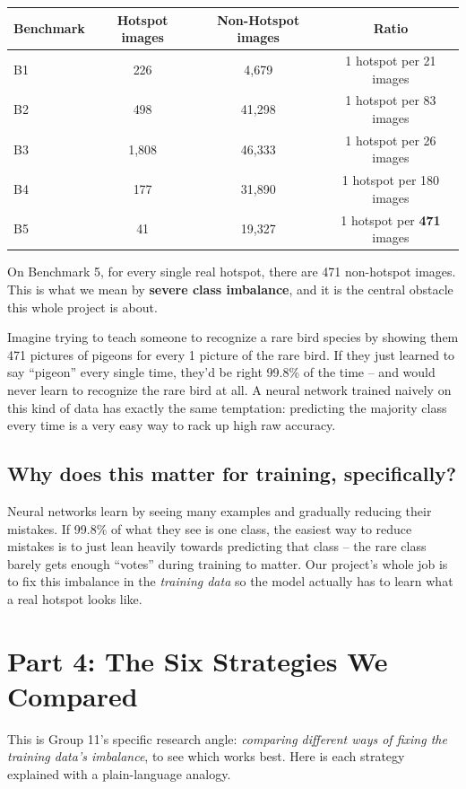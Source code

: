 \documentclass[11pt]{article}
\begin{document}
\begin{center}
\begin{tabular}{lccc}
\toprule
Benchmark & Hotspot images & Non-Hotspot images & Ratio \\
\midrule
B1 & 226  & 4{,}679  & 1 hotspot per 21 images \\
B2 & 498  & 41{,}298 & 1 hotspot per 83 images \\
B3 & 1{,}808 & 46{,}333 & 1 hotspot per 26 images \\
B4 & 177  & 31{,}890 & 1 hotspot per 180 images \\
B5 & 41   & 19{,}327 & 1 hotspot per \textbf{471} images \\
\bottomrule
\end{tabular}
\end{center}

On Benchmark 5, for every single real hotspot, there are 471
non-hotspot images. This is what we mean by \textbf{severe class
imbalance}, and it is the central obstacle this whole project is
about.

\begin{analogy}
Imagine trying to teach someone to recognize a rare bird species by
showing them 471 pictures of pigeons for every 1 picture of the rare
bird. If they just learned to say ``pigeon'' every single time, they'd
be right 99.8\% of the time -- and would never learn to recognize the
rare bird at all. A neural network trained naively on this kind of
data has exactly the same temptation: predicting the majority class
every time is a very easy way to rack up high raw accuracy.
\end{analogy}

\subsection{Why does this matter for training, specifically?}
Neural networks learn by seeing many examples and gradually reducing
their mistakes. If 99.8\% of what they see is one class, the easiest
way to reduce mistakes is to just lean heavily towards predicting that
class -- the rare class barely gets enough ``votes'' during training
to matter. Our project's whole job is to fix this imbalance in the
\emph{training data} so the model actually has to learn what a real
hotspot looks like.

\section{Part 4: The Six Strategies We Compared}
This is Group 11's specific research angle: \emph{comparing different
ways of fixing the training data's imbalance}, to see which works
best. Here is each strategy explained with a plain-language analogy.
\end{document}
